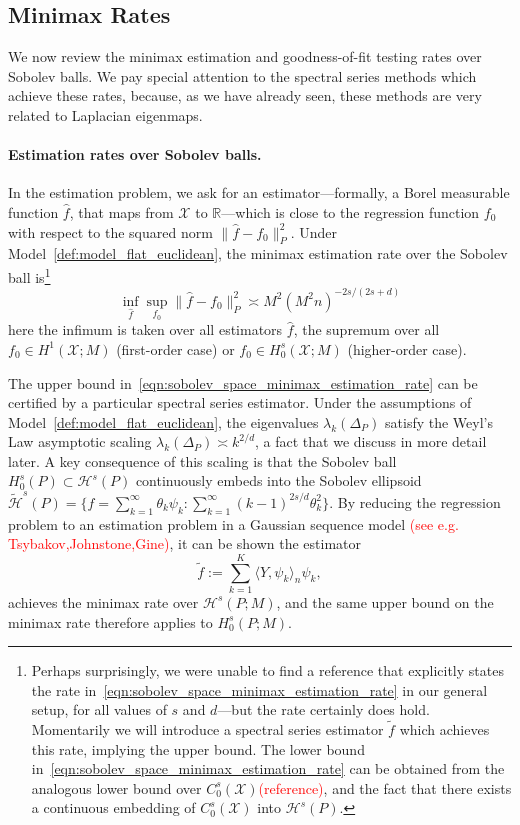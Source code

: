 \documentclass{article}
\newcommand{\Reals}{\mathbb{R}}
\newcommand{\1}{\mathbf{1}}
\newcommand{\mc}[1]{\mathcal{#1}}
\newcommand{\dotp}[2]{\langle #1, #2 \rangle}
\newcommand{\wt}[1]{\widetilde{#1}}
\newcommand{\wh}[1]{\widehat{#1}}
\theoremstyle{alden}
\theoremstyle{aldenthm}
\theoremstyle{definition}
\theoremstyle{remark}
\begin{document}
\subsection{Minimax Rates}
\label{subsec:minimax_rates_sobolev}
We now review the minimax estimation and goodness-of-fit testing rates over Sobolev balls. We pay special attention to the spectral series methods which achieve these rates, because, as we have already seen, these methods are very related to Laplacian eigenmaps.

\paragraph{Estimation rates over Sobolev balls.}
In the estimation problem, we ask for an estimator---formally, a Borel measurable function $\wh{f}$, that maps from $\mc{X}$ to $\Reals$---which is close to the regression function $f_0$ with respect to the squared norm $\|\wh{f} - f_0\|_{P}^2$. Under Model~\ref{def:model_flat_euclidean}, the minimax estimation rate over the Sobolev ball is\footnote{Perhaps surprisingly, we were unable to find a reference that explicitly states the rate in~\eqref{eqn:sobolev_space_minimax_estimation_rate} in our general setup, for all values of $s$ and $d$---but the rate certainly does hold.  Momentarily we will introduce a spectral series estimator $\wt{f}$ which achieves this rate, implying the upper bound. The lower bound in~\eqref{eqn:sobolev_space_minimax_estimation_rate} can be obtained from the analogous lower bound over $C_0^s(\mc{X})$\textcolor{red}{(reference)}, and the fact that there exists a continuous embedding of $C_0^s(\mc{X})$ into $\mc{H}^s(P)$.}
\begin{equation}
\label{eqn:sobolev_space_minimax_estimation_rate}
\inf_{\wh{f}} \sup_{f_0} \|\wh{f} - f_0\|_P^2 \asymp M^2(M^2n)^{-2s/(2s + d)}
\end{equation}
here the infimum is taken over all estimators $\wh{f}$, the supremum over all $f_0 \in H^1(\mc{X};M)$ (first-order case) or $f_0 \in H_0^s(\mc{X};M)$ (higher-order case).

The upper bound in~\eqref{eqn:sobolev_space_minimax_estimation_rate} can be certified by a particular spectral series estimator.  Under the assumptions of Model~\ref{def:model_flat_euclidean}, the eigenvalues $\lambda_k(\Delta_P)$ satisfy the Weyl's Law asymptotic scaling $\lambda_{k}(\Delta_P) \asymp k^{2/d}$, a fact that we discuss in more detail later. A key consequence of this scaling is that the Sobolev ball $H_0^s(P) \subset \mc{H}^s(P)$ continuously embeds into the Sobolev ellipsoid $\mc{\wt{H}}^s(P) = \{f = \sum_{k = 1}^{\infty} \theta_k \psi_k: \sum_{k = 1}^{\infty} (k - 1)^{2s/d} \theta_k^2\}$. By reducing the regression problem to an estimation problem in a Gaussian sequence model \textcolor{red}{(see e.g. Tsybakov,Johnstone,Gine)}, it can be shown the estimator
\begin{equation}
\label{eqn:spectral_series_estimator}
\wt{f} := \sum_{k = 1}^{K} \dotp{Y}{\psi_k}_n \psi_k,
\end{equation}
achieves the minimax rate over $\mc{H}^s(P;M)$, and the same upper bound on the minimax rate therefore applies to $H_0^s(P;M)$. 
\end{document}
